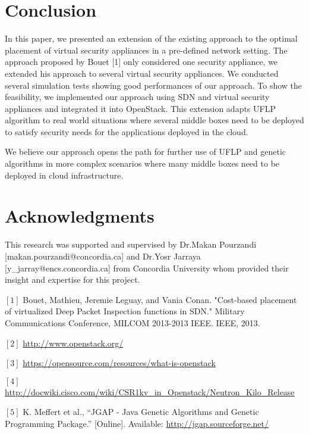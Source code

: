 \documentclass{article}
\begin{document}
\section{Conclusion}
In this paper, we presented an extension of the existing approach to the optimal placement of virtual security appliances in a pre-defined network setting. The approach proposed by Bouet [1] only considered one security appliance, we extended his approach to several virtual security appliances. We conducted several simulation tests showing good performances of our approach. To show the feasibility, we implemented our approach using SDN and virtual security appliances and integrated it into OpenStack. This extension adapts UFLP algorithm to real world situations where several middle boxes need to be deployed to satisfy security needs for the applications deployed in the cloud.

We believe our approach opens the path for further use of UFLP and genetic algorithms in more complex scenarios where many middle boxes need to be deployed in cloud infrastructure.

\section{Acknowledgments}
This research was supported and supervised by Dr.Makan Pourzandi [makan.pourzandi@concordia.ca] and Dr.Yosr Jarraya [y\_jarray@encs.concordia.ca] from Concordia University whom provided their insight and expertise for this project.



\newpage

\item $[1]$ Bouet, Mathieu, Jeremie Leguay, and Vania Conan. "Cost-based placement of virtualized Deep Packet Inspection
functions in SDN." Military Communications Conference, MILCOM 2013-2013 IEEE. IEEE, 2013.
\item $[2]$ \url{http://www.openstack.org/}
\item $[3]$ \url{https://opensource.com/resources/what-is-openstack}
\item $[4]$ \url{http://docwiki.cisco.com/wiki/CSR1kv_in_Openstack/Neutron_Kilo_Release}
\item $[5]$ K. Meffert et al., “JGAP - Java Genetic Algorithms and Genetic Programming Package.” [Online]. Available: \url{http://jgap.sourceforge.net/}

\end{document}
